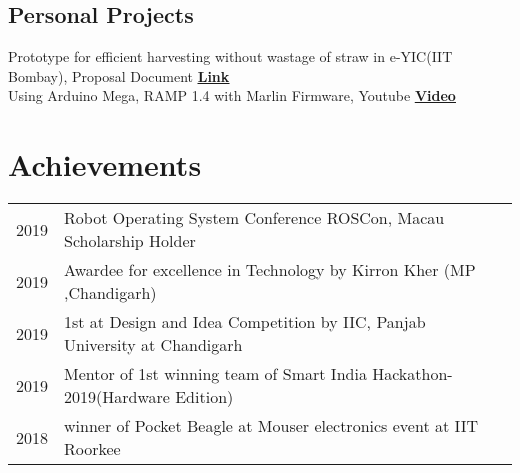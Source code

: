 \documentclass[]{font}
\begin{document}
\begin{minipage}[t]{0.69\textwidth}
\subsection{Personal Projects}
\textbullet{} Prototype for efficient harvesting without wastage of straw in e-YIC(IIT Bombay), Proposal Document \underline{\textbf{\href{https://drive.google.com/file/d/0B0cF1Lq6c1cPcURJdkJjQmVFcFk3eTgtTGg5VktPVHJWWU5R/view?usp=sharing}{Link}}}  \\
\vspace{\topsep} %
\textbullet{} Using Arduino Mega, RAMP 1.4 with Marlin Firmware, Youtube \textbf{\href{https://www.youtube.com/watch?v=D679CJQNnKo&t=1s}{\underline{Video}}}
\sectionsep



\section{Achievements} 
\begin{tabular}{rll}
2019         & Robot Operating System Conference ROSCon, Macau Scholarship Holder\\
2019         & Awardee for excellence in Technology by Kirron Kher (MP ,Chandigarh)\\
2019         & 1st at Design and Idea Competition by IIC, Panjab University at Chandigarh \\  
2019         & Mentor of 1st winning team of Smart India Hackathon-2019(Hardware Edition)\\ 
2018	     & winner of Pocket Beagle at Mouser electronics event at IIT Roorkee \\
\end{tabular}
\sectionsep


\end{minipage} 
\end{document}
